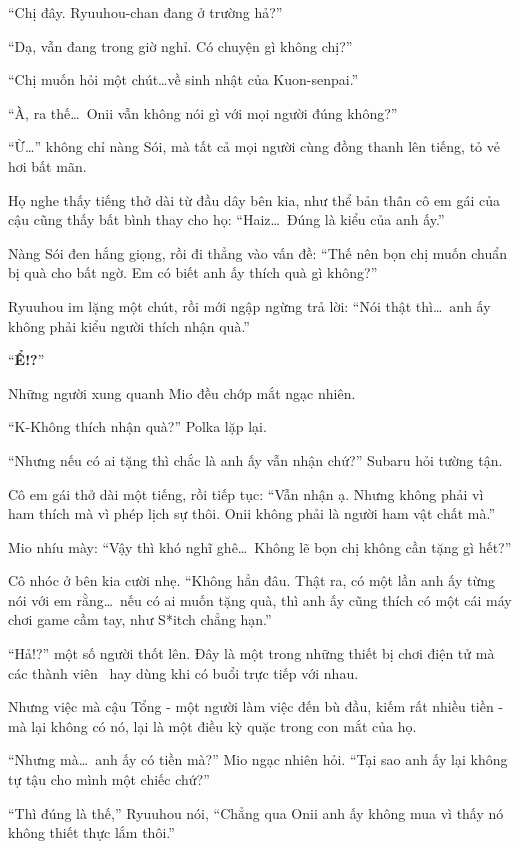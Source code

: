 \documentclass[../main.tex]{subfiles}
\begin{document}
``Chị đây. Ryuuhou-chan đang ở trường hả?''

``Dạ, vẫn đang trong giờ nghỉ. Có chuyện gì không chị?''

``Chị muốn hỏi một chút\dots về sinh nhật của Kuon-senpai.''

``À, ra thế\dots\ Onii vẫn không nói gì với mọi người đúng không?''

``Ừ\dots'' không chỉ nàng Sói, mà tất cả mọi người cùng đồng thanh lên tiếng, tỏ vẻ hơi bất mãn.

Họ nghe thấy tiếng thở dài từ đầu dây bên kia, như thể bản thân cô em gái của cậu cũng thấy bất bình thay cho họ: ``Haiz\dots\ Đúng là kiểu của anh ấy.''

Nàng Sói đen hắng giọng, rồi đi thẳng vào vấn đề: ``Thế nên bọn chị muốn chuẩn bị quà cho bất ngờ. Em có biết anh ấy thích quà gì không?''

Ryuuhou im lặng một chút, rồi mới ngập ngừng trả lời: ``Nói thật thì\dots\ anh ấy không phải kiểu người thích nhận quà.''

``\textbf{Ể!?}''

Những người xung quanh Mio đều chớp mắt ngạc nhiên.

``K-Không thích nhận quà?'' Polka lặp lại.

``Nhưng nếu có ai tặng thì chắc là anh ấy vẫn nhận chứ?'' Subaru hỏi tường tận.

Cô em gái thở dài một tiếng, rồi tiếp tục: ``Vẫn nhận ạ. Nhưng không phải vì ham thích mà vì phép lịch sự thôi. Onii không phải là người ham vật chất mà.''

Mio nhíu mày: ``Vậy thì khó nghĩ ghê\dots\ Không lẽ bọn chị không cần tặng gì hết?''

Cô nhóc ở bên kia cười nhẹ. ``Không hẳn đâu. Thật ra, có một lần anh ấy từng nói với em rằng\dots\ nếu có ai muốn tặng quà, thì anh ấy cũng thích có một cái máy chơi game cầm tay, như S*itch chẳng hạn.''

``Hả!?'' một số người thốt lên. Đây là một trong những thiết bị chơi điện tử mà các thành viên \hll\ hay dùng khi có buổi trực tiếp với nhau.

Nhưng việc mà cậu Tổng - một người làm việc đến bù đầu, kiếm rất nhiều tiền - mà lại không có nó, lại là một điều kỳ quặc trong con mắt của họ.

``Nhưng mà\dots\ anh ấy có tiền mà?'' Mio ngạc nhiên hỏi. ``Tại sao anh ấy lại không tự tậu cho mình một chiếc chứ?''

``Thì đúng là thế,'' Ryuuhou nói, ``Chẳng qua Onii anh ấy không mua vì thấy nó không thiết thực lắm thôi.''
\end{document}
